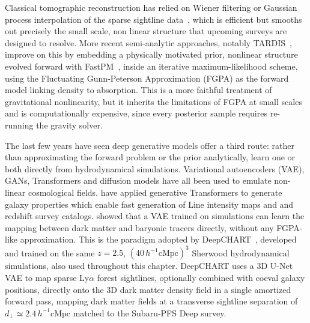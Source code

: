 Classical tomographic reconstruction has relied on Wiener filtering or Gaussian process interpolation of the sparse sightline data~\citep{Lee_2014,Lee_2018}, which is efficient but smooths out precisely the small scale, non linear structure that upcoming surveys are designed to resolve. More recent semi-analytic approaches, notably TARDIS~\citep{horowitz_2019,horowitz_2021}, improve on this by embedding a physically motivated prior, nonlinear structure evolved forward with FastPM~\citep{feng_fastpm_2016}, inside an iterative maximum-likelihood scheme, using the Fluctuating Gunn-Peterson Approximation (FGPA) as the forward model linking density to absorption. This is a more faithful treatment of gravitational nonlinearity, but it inherits the limitations of FGPA at small scales and is computationally expensive, since every posterior sample requires re-running the gravity solver.

The last few years have seen deep generative models offer a third route: rather than approximating the forward problem or the prior analytically, learn one or both directly from hydrodynamical simulations. Variational autoencoders (VAE), GANs, Transformers and diffusion models have all been used to emulate non-linear cosmological fields. \citet{Moriwaki_2025} have applied generative Transformers to generate galaxy properties which enable fast generation of Line intensity maps and and redshift survey catalogs. \citet{Horowitz_2022} showed that a VAE trained on simulations can learn the mapping between dark matter and baryonic tracers directly, without any FGPA-like approximation. This is the paradigm adopted by DeepCHART~\citep{Maitra_2026}, developed and trained on the same $z=2.5$, $(40\,h^{-1}\mathrm{cMpc})^3$ Sherwood hydrodynamical simulations, also used throughout this chapter. DeepCHART uses a 3D U-Net VAE to map sparse Ly$\alpha$ forest sightlines, optionally combined with coeval galaxy positions, directly onto the 3D dark matter density field in a single amortized forward pass, mapping dark matter fields at a transverse sightline separation of $d_\perp \simeq 2.4\,h^{-1}\mathrm{cMpc}$ matched to the Subaru-PFS Deep survey.

